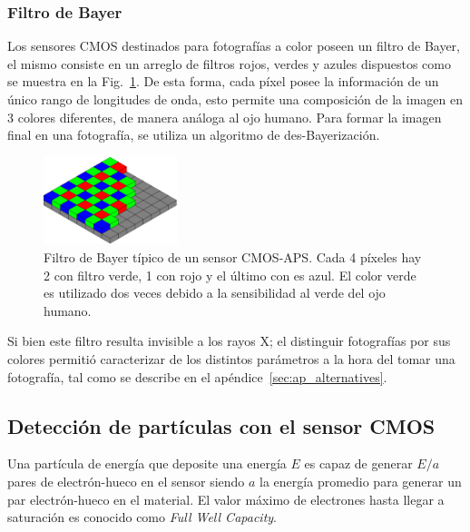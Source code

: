 \documentclass[twoside,twocolumn]{article}
\begin{document}
    \subsubsection*{\hspace{5mm}Filtro de Bayer}\label{sec:intro:bayer}
      Los sensores CMOS destinados para fotografías a color poseen un filtro de Bayer, 
      el mismo consiste en un arreglo de filtros rojos, verdes y azules dispuestos como se muestra en la Fig.~\ref{fig:bayer}.
      De esta forma, cada píxel posee la información de un único rango de longitudes de onda, 
      esto permite una composición de la imagen en 3 colores diferentes, de manera análoga al ojo humano.
      Para formar la imagen final en una fotografía, se utiliza un algoritmo de des-Bayerización.\cite{picamera}

      \begin{figure}[h]
        \centering
        \includegraphics[width=0.35\textwidth]{figures/Bayer_pattern.png}
        \caption{Filtro de Bayer típico de un sensor CMOS-APS. Cada 4 píxeles hay 2 con filtro verde, 1 con rojo y el último con es azul.
          El color verde es utilizado dos veces debido a la sensibilidad al verde del ojo humano.}
        \label{fig:bayer}
      \end{figure}

      Si bien este filtro resulta invisible a los rayos X; %
      el distinguir fotografías por sus colores permitió caracterizar
      de los distintos parámetros a la hora del tomar una fotografía,
      tal como se describe en el apéndice~\ref{sec:ap_alternatives}.

    \subsection{Detección de partículas con el sensor CMOS}\label{sec:intro:detection}   

      Una partícula de energía que deposite una energía $E$
      es capaz de generar $E / a$ pares de electrón-hueco en el sensor
      siendo $a$ la energía promedio para generar un par electrón-hueco en el material.
      El valor máximo de electrones hasta llegar a saturación es conocido como \emph{Full Well Capacity}.
      
\end{document}
